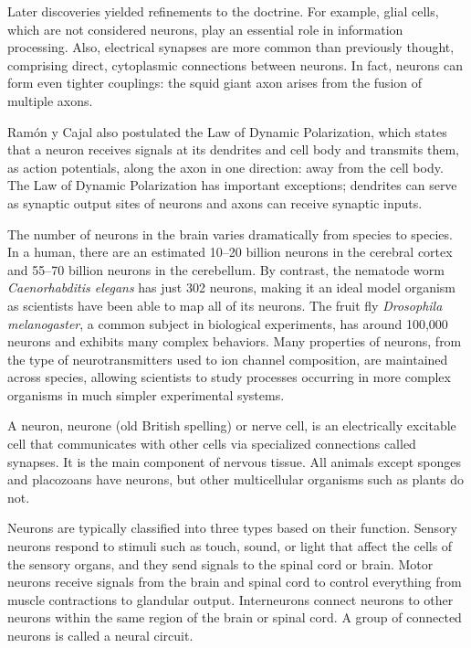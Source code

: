Later discoveries yielded refinements to the doctrine. For example, glial cells, which are not considered neurons, play an essential role in information processing. Also, electrical synapses are more common than previously thought, comprising direct, cytoplasmic connections between neurons. In fact, neurons can form even tighter couplings: the squid giant axon arises from the fusion of multiple axons.

Ramón y Cajal also postulated the Law of Dynamic Polarization, which states that a neuron receives signals at its dendrites and cell body and transmits them, as action potentials, along the axon in one direction: away from the cell body. The Law of Dynamic Polarization has important exceptions; dendrites can serve as synaptic output sites of neurons and axons can receive synaptic inputs.

The number of neurons in the brain varies dramatically from species to species. In a human, there are an estimated 10--20 billion neurons in the cerebral cortex and 55--70 billion neurons in the cerebellum. By contrast, the nematode worm \emph{Caenorhabditis elegans} has just 302 neurons, making it an ideal model organism as scientists have been able to map all of its neurons. The fruit fly \emph{Drosophila melanogaster}, a common subject in biological experiments, has around 100,000 neurons and exhibits many complex behaviors. Many properties of neurons, from the type of neurotransmitters used to ion channel composition, are maintained across species, allowing scientists to study processes occurring in more complex organisms in much simpler experimental systems.

A neuron, neurone (old British spelling) or nerve cell, is an electrically excitable cell that communicates with other cells via specialized connections called synapses. It is the main component of nervous tissue. All animals except sponges and placozoans have neurons, but other multicellular organisms such as plants do not.

Neurons are typically classified into three types based on their function. Sensory neurons respond to stimuli such as touch, sound, or light that affect the cells of the sensory organs, and they send signals to the spinal cord or brain. Motor neurons receive signals from the brain and spinal cord to control everything from muscle contractions to glandular output. Interneurons connect neurons to other neurons within the same region of the brain or spinal cord. A group of connected neurons is called a neural circuit.

